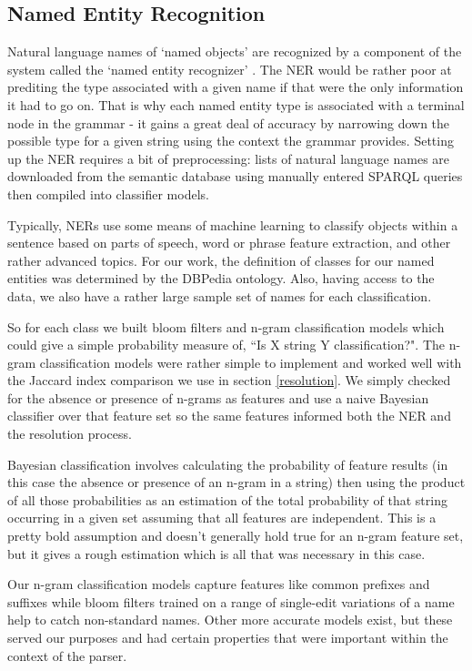 \documentclass[11pt]{article}
\begin{document}
\subsection{Named Entity Recognition}
\label{ner}
Natural language names of `named objects' are recognized by a component of the system
called the `named entity recognizer' \cite{ner1,ner2}. 
The NER would be rather poor at prediting the type associated with a given name if that
were the only information it had to go on. That is why each named entity type is associated
with a terminal node in the grammar - it gains a great deal of accuracy by narrowing down
the possible type for a given string using the context the grammar provides.
Setting up the NER requires a bit of preprocessing:
lists of natural language names are downloaded from the semantic database using
manually entered SPARQL queries then compiled into classifier models.

Typically, NERs use some means of machine learning to classify objects within a
sentence based on parts of speech, word or phrase feature extraction, and other
rather advanced topics\cite{ner1}. 
For our work, the definition of classes for our named entities was determined by the
DBPedia ontology. Also, having access to the data, we also have a rather large sample
set of names for each classification.

So for each class we built bloom filters\cite{bloom} and n-gram classification models 
which could give a simple probability measure of, ``Is X string Y classification?". 
The n-gram classification models were rather simple to implement and worked well 
with the Jaccard index comparison we use in section \ref{resolution}. We simply
checked for the absence or presence of n-grams as features and use a naive
Bayesian classifier over that feature set\cite{bayes} so the same features
informed both the NER and the resolution process.

Bayesian classification involves calculating the probability of feature results
(in this case the absence or presence of an n-gram in a string) then using the product
of all those probabilities as an estimation of the total probability of that string
occurring in a given set assuming that all features are independent. This is a
pretty bold assumption and doesn't generally hold true for an n-gram feature set,
but it gives a rough estimation which is all that was necessary in this case.

Our n-gram classification models capture features like common prefixes and suffixes
while bloom filters trained on a range of single-edit variations of a name help
to catch non-standard names. Other more accurate models exist, but these served
our purposes and had certain properties that were important within the context
of the parser.
\end{document}
